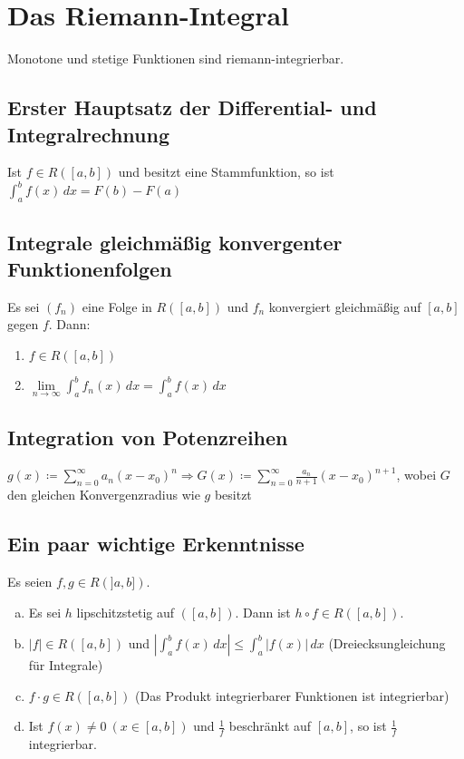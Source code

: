 \section{Das Riemann-Integral}
Monotone und stetige Funktionen sind riemann-integrierbar.

\subsection{Erster Hauptsatz der Differential- und Integralrechnung}
Ist $f \in R([a,b])$ und besitzt eine Stammfunktion, so ist $\int_a^b f(x)\,dx = F(b) - F(a)$

\subsection{Integrale gleichmäßig konvergenter Funktionenfolgen}
Es sei $(f_n)$ eine Folge in $R([a,b])$ und $f_n$ konvergiert gleichmäßig auf $[a,b]$ gegen $f$. Dann:
\begin{enumerate}
    \item $f \in R([a,b])$
    \item $\lim \limits_{n \to \infty} \int_a^b f_n(x)\,dx = \int_a^b f(x)\,dx$
\end{enumerate}

\subsection{Integration von Potenzreihen}
$g(x) \coloneqq \sum \limits_{n=0}^{\infty} a_n (x-x_0)^n \Rightarrow G(x) \coloneqq \sum \limits_{n=0}^{\infty} \frac{a_n}{n+1} (x-x_0)^{n+1}$, 
wobei $G$ den gleichen Konvergenzradius wie $g$ besitzt

\subsection{Ein paar wichtige Erkenntnisse}
Es seien $f,g \in R(]a,b])$.
\begin{enumerate} [a)]
    \item Es sei $h$ lipschitzstetig auf $([a,b])$. Dann ist $h \circ f \in R([a,b])$.
    \item $|f| \in R([a,b])$ und $|\int_a^b f(x)\,dx| \leq \int_a^b|f(x)|\,dx$ (Dreiecksungleichung für Integrale)
    \item $f \cdot g \in R([a,b])$ (Das Produkt integrierbarer Funktionen ist integrierbar)
    \item Ist $f(x) \neq 0\ (x \in [a,b])$ und $\frac{1}{f}$ beschränkt auf $[a,b]$, so ist $\frac{1}{f}$ integrierbar.
\end{enumerate}

